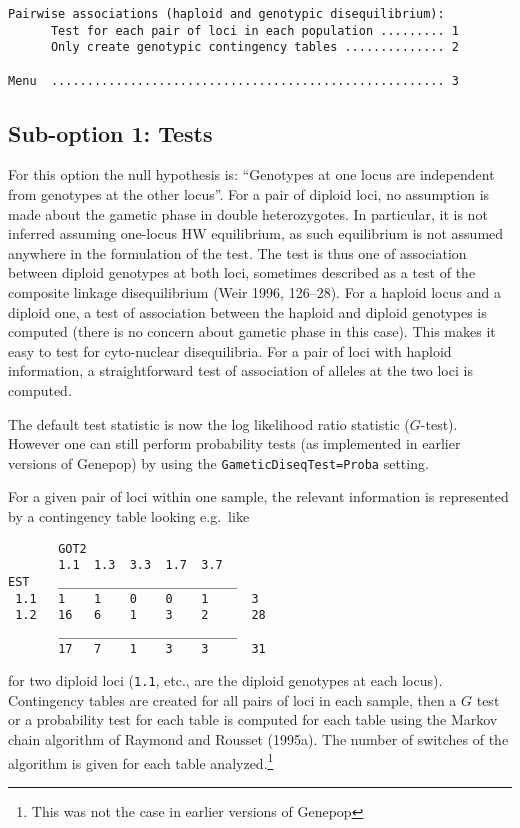 \documentclass[12pt,]{book}
\let\rmarkdownfootnote\footnote%
\def\footnote{\protect\rmarkdownfootnote}
\theoremstyle{definition}
\theoremstyle{definition}
\theoremstyle{definition}
\theoremstyle{remark}
\begin{document}
\begin{verbatim}
Pairwise associations (haploid and genotypic disequilibrium):
      Test for each pair of loci in each population ......... 1
      Only create genotypic contingency tables .............. 2

Menu  ....................................................... 3
\end{verbatim}

\subsection{Sub-option 1: Tests}\label{sub-option-1-tests}

For this option the null hypothesis is: ``Genotypes at one locus are
independent from genotypes at the other locus''. For a pair of diploid
loci, no assumption is made about the gametic phase in double
heterozygotes. In particular, it is not inferred assuming one-locus HW
equilibrium, as such equilibrium is not assumed anywhere in the
formulation of the test. The test is thus one of association between
diploid genotypes at both loci, sometimes described as a test of the
composite linkage disequilibrium
(Weir 1996, 126--28). For a haploid locus and a diploid one, a test of
association between the haploid and diploid genotypes is computed (there
is no concern about gametic phase in this case). This makes it easy to
test for cyto-nuclear
disequilibria. For a pair of
loci with haploid information, a straightforward test of association of
alleles at the two loci is computed.

The default test statistic is now the log likelihood ratio statistic
(\(G\)-test). However one can still perform probability tests (as
implemented in earlier versions of Genepop) by using the
\texttt{GameticDiseqTest=Proba} setting.

For a given pair of loci within one sample, the relevant information is
represented by a contingency table looking e.g.~like

\begin{verbatim}
       GOT2
       1.1  1.3  3.3  1.7  3.7
EST    _________________________
 1.1   1    1    0    0    1      3
 1.2   16   6    1    3    2      28
       _________________________
       17   7    1    3    3      31
\end{verbatim}

for two diploid loci (\texttt{1.1}, etc., are the diploid genotypes at
each locus). Contingency tables are created for all pairs of loci in
each sample, then a \(G\) test or a probability test for each table is
computed for each table using the Markov chain algorithm of Raymond and
Rousset (1995a). The number of
switches of the algorithm is
given for each table analyzed.\footnote{This was not the case in earlier
  versions of Genepop}
\end{document}

